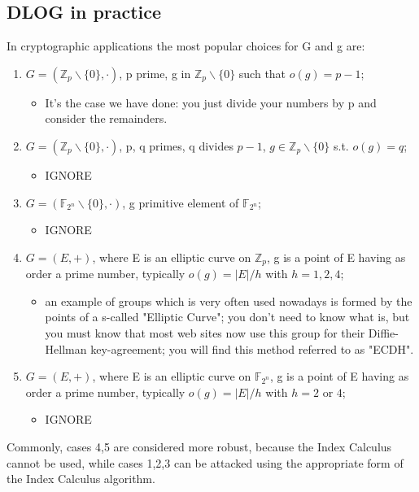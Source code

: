 \documentclass[a4paper, 10pt, titlepage]{article}
\begin{document}
\subsection{DLOG in practice}
In cryptographic applications the most popular choices for G and g are:
\begin{enumerate}
\item $G = (\mathbb{Z}_p \backslash \{0\}, \cdot)$, p prime, g in $\mathbb{Z}_p \backslash \{0\}$ such that $o(g) = p - 1$;
\begin{itemize}
\item It's the case we have done: you just divide your numbers by p and consider the remainders.
\end{itemize}
\item $G = (\mathbb{Z}_p \backslash \{0\}, \cdot)$, p, q primes, q divides $p - 1$, $g \in \mathbb{Z}_p \backslash \{0\}$ s.t. $o(g) = q$;
\begin{itemize}
\item IGNORE
\end{itemize}
\item $G = (\mathbb{F}_{2^n} \backslash \{0\}, \cdot)$, g primitive element of $\mathbb{F}_{2^n}$;
\begin{itemize}
\item IGNORE
\end{itemize}
\item $G = (E,+)$, where E is an elliptic curve on $\mathbb{Z}_p$, g is a point of E having as order a prime number, typically $o(g) = |E|/h$ with $h = 1, 2, 4$;
\begin{itemize}
\item an example of groups which is very often used nowadays is formed by the points of a s-called "Elliptic Curve"; you don't need to know what is, but you must know that most web sites now use this group for their Diffie-Hellman key-agreement; you will find this method referred to as "ECDH".
\end{itemize}
\item $G = (E,+)$, where E is an elliptic curve on $\mathbb{F}_{2^n}$, g is a point of E having as order a prime number, typically $o(g) = |E|/h$ with $h = 2$ or $4$;
\begin{itemize}
\item IGNORE
\end{itemize}
\end{enumerate}
Commonly, cases 4,5 are considered more robust, because the Index
Calculus cannot be used, while cases 1,2,3 can be attacked using the
appropriate form of the Index Calculus algorithm.
\end{document}
